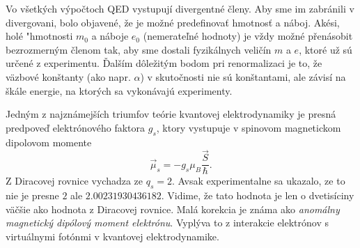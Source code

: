 \documentclass[../../main.tex]{subfiles}
\begin{document}
Vo všetkých výpočtoch QED vystupují divergentné členy. Aby sme im zabránili v divergovani, bolo objavené, že je možné predefinovať hmotnosť a náboj. Akési, holé "hmotnosti $m_0$ a náboje $e_0$ (nemerateľné hodnoty) je vždy možné přenásobit bezrozmerným členom tak, aby sme dostali fyzikálnych veličín $m$ a $e$, ktoré už sú určené z experimentu. Ďalším dôležitým bodom pri renormalizaci je to, že väzbové konštanty (ako napr. $\alpha$) v skutočnosti nie sú konštantami, ale závisí na škále energie, na ktorých sa vykonávajú experimenty.\par
Jedným z najznámejších triumfov teórie kvantovej elektrodynamiky je presná predpoveď elektrónového faktora $g_s$, ktory vystupuje v spinovom magnetickom dipolovom momente 
\begin{equation}
\vec{\mu}_s=-g_s\mu_B\frac{\vec{S}}{\hbar}.
\end{equation}
Z Diracovej rovnice vychadza ze $q_s=2$. Avsak experimentalne sa ukazalo, ze to nie je presne $2$ ale $2.00231930436182$. Vidime, že tato hodnota je len o dvetisíciny väčšie ako hodnota z Diracovej rovnice. Malá korekcia je známa ako \textit{anomálny magnetický dipólový moment elektrónu}. Vyplýva to z interakcie elektrónov s virtuálnymi fotónmi v kvantovej elektrodynamike.
\end{document}
